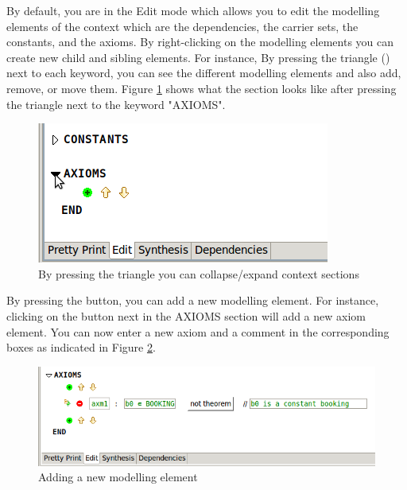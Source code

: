 By default, you are in the \textsf{Edit} mode which allows you to edit the modelling elements of the context which are the dependencies, the carrier sets, the constants, and the axioms. By right-clicking on the modelling elements you can create new child and sibling elements. For instance,
By pressing the triangle () next to each keyword, you can see the different modelling elements and also add, remove, or move them. Figure \ref{fig_ref_01_eventb_editor2} shows what the section looks like after pressing the triangle next to the keyword "AXIOMS".

\begin{figure}[!ht]
\begin{center}
	\includegraphics{img/reference/ref_01_eventb_editor2.png}
	\caption{By pressing the triangle you can collapse/expand context sections}
	\label{fig_ref_01_eventb_editor2}
\end{center}
\end{figure}

By pressing the  button, you can add a new modelling element. For instance, clicking on the  button next in the \textsf{AXIOMS} section will add a new axiom element. You can now enter a new axiom and a comment in the corresponding boxes as indicated in Figure \ref{fig_ref_01_eventb_editor3}.

\begin{figure}[!ht]
\begin{center}
	\includegraphics{img/reference/ref_01_eventb_editor3.png}
	\caption{Adding a new modelling element}
	\label{fig_ref_01_eventb_editor3}
\end{center}
\end{figure}

